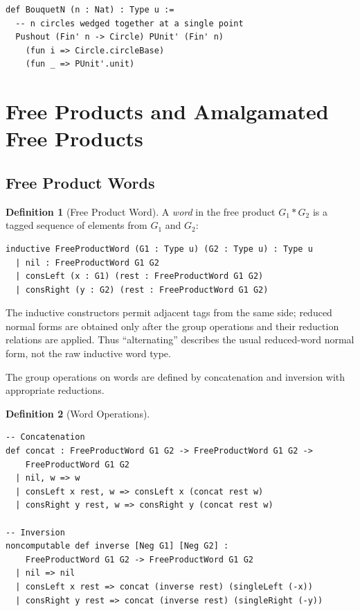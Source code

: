 \documentclass{lmcs}
\theoremstyle{definition}
\newtheorem{definition}{Definition}[section]
\theoremstyle{plain}
\theoremstyle{remark}
\newcommand{\FreeProduct}{\ast}
\begin{document}
\begin{lstlisting}
def BouquetN (n : Nat) : Type u :=
  -- n circles wedged together at a single point
  Pushout (Fin' n -> Circle) PUnit' (Fin' n)
    (fun i => Circle.circleBase)
    (fun _ => PUnit'.unit)
\end{lstlisting}

\section{Free Products and Amalgamated Free Products}
\label{sec:freeproducts}

\subsection{Free Product Words}

\begin{definition}[Free Product Word]
A \emph{word} in the free product $G_1 \FreeProduct G_2$ is a tagged sequence
of elements from $G_1$ and $G_2$:
\begin{lstlisting}
inductive FreeProductWord (G1 : Type u) (G2 : Type u) : Type u
  | nil : FreeProductWord G1 G2
  | consLeft (x : G1) (rest : FreeProductWord G1 G2)
  | consRight (y : G2) (rest : FreeProductWord G1 G2)
\end{lstlisting}
\end{definition}

The inductive constructors permit adjacent tags from the same side; reduced
normal forms are obtained only after the group operations and their reduction
relations are applied. Thus ``alternating'' describes the usual reduced-word
normal form, not the raw inductive word type.

The group operations on words are defined by concatenation and inversion with appropriate reductions.

\begin{definition}[Word Operations]
\leavevmode
\begin{lstlisting}
-- Concatenation
def concat : FreeProductWord G1 G2 -> FreeProductWord G1 G2 ->
    FreeProductWord G1 G2
  | nil, w => w
  | consLeft x rest, w => consLeft x (concat rest w)
  | consRight y rest, w => consRight y (concat rest w)

-- Inversion
noncomputable def inverse [Neg G1] [Neg G2] :
    FreeProductWord G1 G2 -> FreeProductWord G1 G2
  | nil => nil
  | consLeft x rest => concat (inverse rest) (singleLeft (-x))
  | consRight y rest => concat (inverse rest) (singleRight (-y))
\end{lstlisting}
\end{definition}
\end{document}
